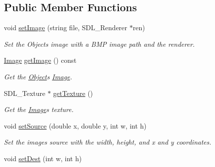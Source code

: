 \subsection*{Public Member Functions}
\begin{DoxyCompactItemize}
\item 
void \hyperlink{classObject_a7f984ff2fb0c60b942a1018fc48417ae}{set\+Image} (string file, S\+D\+L\+\_\+\+Renderer $\ast$ren)\hypertarget{classObject_a7f984ff2fb0c60b942a1018fc48417ae}{}\label{classObject_a7f984ff2fb0c60b942a1018fc48417ae}

\begin{DoxyCompactList}\small\item\em Set the Objects image with a B\+MP image path and the renderer. \end{DoxyCompactList}\item 
\hyperlink{classImage}{Image} \hyperlink{classObject_a76748c591087e0a3c676daea6f257e08}{get\+Image} () const \hypertarget{classObject_a76748c591087e0a3c676daea6f257e08}{}\label{classObject_a76748c591087e0a3c676daea6f257e08}

\begin{DoxyCompactList}\small\item\em Get the \hyperlink{classObject}{Object}\textquotesingle{}s \hyperlink{classImage}{Image}. \end{DoxyCompactList}\item 
S\+D\+L\+\_\+\+Texture $\ast$ \hyperlink{classObject_af8ae0f74940285c54e90f19027bba3a7}{get\+Texture} ()\hypertarget{classObject_af8ae0f74940285c54e90f19027bba3a7}{}\label{classObject_af8ae0f74940285c54e90f19027bba3a7}

\begin{DoxyCompactList}\small\item\em Get the \hyperlink{classImage}{Image}\textquotesingle{}s texture. \end{DoxyCompactList}\item 
void \hyperlink{classObject_a094e6dc25b31cfac9d745869a878bd8b}{set\+Source} (double x, double y, int w, int h)\hypertarget{classObject_a094e6dc25b31cfac9d745869a878bd8b}{}\label{classObject_a094e6dc25b31cfac9d745869a878bd8b}

\begin{DoxyCompactList}\small\item\em Set the images source with the width, height, and x and y coordinates. \end{DoxyCompactList}\item 
void \hyperlink{classObject_a0ba46a30886b3d30e2b9a8a263b6c9b9}{set\+Dest} (int w, int h)\hypertarget{classObject_a0ba46a30886b3d30e2b9a8a263b6c9b9}{}\label{classObject_a0ba46a30886b3d30e2b9a8a263b6c9b9}


\end{DoxyCompactItemize}
